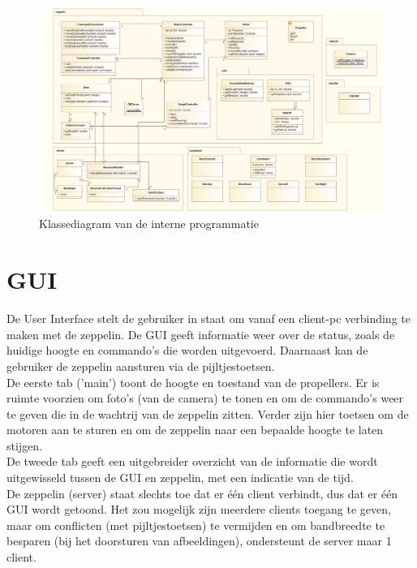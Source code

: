 \documentclass[eind]{penoverslag}
\begin{document}
\begin{figure}[ht!]
\centering
\includegraphics[scale=0.4, angle=90]{UML.png}
\caption{Klassediagram van de interne programmatie}
\label{UML}
\end{figure}

\section{GUI}
De User Interface stelt de gebruiker in staat om vanaf een client-pc verbinding te maken met de zeppelin. De GUI geeft informatie weer over de status, zoals de huidige hoogte en commando's die worden uitgevoerd. Daarnaast kan de gebruiker de zeppelin aansturen via de pijltjestoetsen. \\

De eerste tab ('main') toont de hoogte en toestand van de propellers. Er is ruimte voorzien om foto's (van de camera) te tonen en om de commando's weer te geven die in de wachtrij van de zeppelin zitten. Verder zijn hier toetsen om de motoren aan te sturen en om de zeppelin naar een bepaalde hoogte te laten stijgen.\\

De tweede tab geeft een uitgebreider overzicht van de informatie die wordt uitgewisseld tussen de GUI en zeppelin, met een indicatie van de tijd. \\

De zeppelin (server) staat slechts toe dat er \'e\'en client verbindt, dus dat er \'e\'en GUI wordt getoond. Het zou mogelijk zijn meerdere clients toegang te geven, maar om conflicten (met pijltjestoetsen) te vermijden en om bandbreedte te besparen (bij het doorsturen van afbeeldingen), ondersteunt de server maar 1 client. \\
\end{document}
